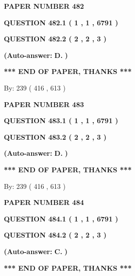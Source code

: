 \documentclass[12pt]{article}
\begin{document}
   
 {\textbf{ \Large{ PAPER NUMBER  482  }}}
   
   
   
   
  
  
{\textbf{\large{QUESTION
482.1 
 ( 1 , 1 , 6791 )
}}}
  
  
{\textbf{\large{QUESTION
482.2 
 ( 2 , 2 , 3 )
}}}
 
 
{\textbf{(Auto-answer:}}
{\textbf{\large{
D.}}}
{\textbf{)}}
 
 
   
   
   
   
\vspace{1.0in} 
{\textbf{\large{ *** END OF PAPER, THANKS *** }}} 
   
   
\hspace{1.0in} By: 
 239 ( 416 ,  613 )
   
   
   
   
\newpage 
\setcounter{page}{ 
   483001 } 
   
   
 {\textbf{ \Large{ PAPER NUMBER  483  }}}
   
   
   
   
  
  
{\textbf{\large{QUESTION
483.1 
 ( 1 , 1 , 6791 )
}}}
  
  
{\textbf{\large{QUESTION
483.2 
 ( 2 , 2 , 3 )
}}}
 
 
{\textbf{(Auto-answer:}}
{\textbf{\large{
D.}}}
{\textbf{)}}
 
 
   
   
   
   
\vspace{1.0in} 
{\textbf{\large{ *** END OF PAPER, THANKS *** }}} 
   
   
\hspace{1.0in} By: 
 239 ( 416 ,  613 )
   
   
   
   
\newpage 
\setcounter{page}{ 
   484001 } 
   
   
 {\textbf{ \Large{ PAPER NUMBER  484  }}}
   
   
   
   
  
  
{\textbf{\large{QUESTION
484.1 
 ( 1 , 1 , 6791 )
}}}
  
  
{\textbf{\large{QUESTION
484.2 
 ( 2 , 2 , 3 )
}}}
 
 
{\textbf{(Auto-answer:}}
{\textbf{\large{
C.}}}
{\textbf{)}}
 
 
   
   
   
   
\vspace{1.0in} 
{\textbf{\large{ *** END OF PAPER, THANKS *** }}} 
   
\end{document}
